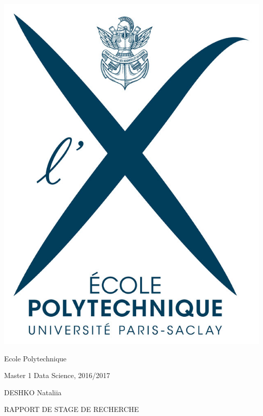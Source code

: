 \documentclass[12pt,a4paper]{article}
\begin{document}
\begin{titlepage}

\newcommand{\HRule}{\rule{\linewidth}{0.5mm}} %

 

\includegraphics[scale=0.2]{figures/X_logo.jpg} 

Ecole Polytechnique

Master 1 Data Science, 2016/2017 

\large DESHKO Nataliia \\[1cm]

\begin{center}
\textsc{\LARGE RAPPORT DE STAGE DE RECHERCHE}\\[1cm]


\end{center}
\end{titlepage}
\end{document}
